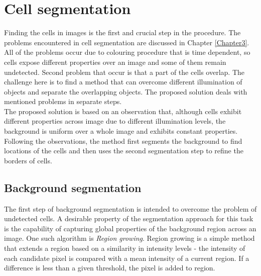 
\chapter{Cell segmentation} %

\label{Chapter4} %



Finding the cells in images is the first and crucial step in the procedure. The problems encountered in cell segmentation are discussed in Chapter \ref{Chapter3}. All of the problems occur due to colouring procedure that is time dependent, so cells expose different properties over an image and some of them remain undetected. Second problem that occur is that a part of the cells overlap. The challenge here is to find a method that can overcome different illumination of objects and separate the overlapping objects. The proposed solution deals with mentioned problems in separate steps. \\


The proposed solution is based on an observation that, although cells exhibit different properties across image due to different illumination levels, the background is uniform over a whole image and exhibits constant properties. Following the observations, the method first segments the background to find locations of the cells and then uses the second segmentation step to refine the borders of cells. \\





\section{Background segmentation}

The first step of background segmentation is intended to overcome the problem of undetected cells. A desirable property of the segmentation approach for this task is the capability of capturing global properties of the background region across an image. One such algorithm is \textit{Region growing}. Region growing is a simple method that extends a region based on a similarity in intensity levels - the intensity of each candidate pixel is compared with a mean intensity of a current region. If a difference is less than a given threshold, the pixel is added to region. \\

